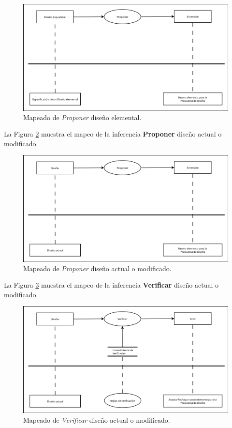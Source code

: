 \begin{figure}[H]
  \centering
  \includegraphics[scale=0.35]{imaxes/DisenoEsqueletalProponerExtension.png}
  \caption{\label{fig:DisenoEsqueletalProponerExtension}Mapeado de \textit{Proponer} diseño elemental.}
\end{figure}

La Figura \ref{fig:DisenoProponerExtension} muestra el mapeo de la inferencia \textbf{Proponer} diseño actual o modificado.

\begin{figure}[H]
  \centering
  \includegraphics[scale=0.35]{imaxes/DisenoProponerExtension.png}
  \caption{\label{fig:DisenoProponerExtension}Mapeado de \textit{Proponer} diseño actual o modificado.}
\end{figure}

La Figura \ref{fig:DisenoVerificarValor} muestra el mapeo de la inferencia \textbf{Verificar} diseño actual o modificado.

\begin{figure}[H]
  \centering
  \includegraphics[scale=0.35]{imaxes/DisenoVerificarValor.png}
  \caption{\label{fig:DisenoVerificarValor}Mapeado de \textit{Verificar} diseño actual o modificado.}
\end{figure}

